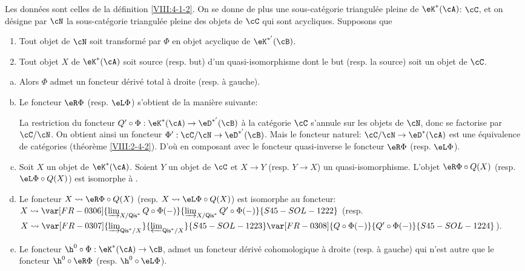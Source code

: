 \begin{theorem}\label{VIII:4-2-3} %
Les données sont celles de la définition \ref{VIII:4-1-2}. On se donne de 
plus une sous-catégorie triangulée pleine de $\eK^\ast(\cA)$: $\cC$, et on 
désigne par $\cN$ la sous-catégorie triangulée pleine des objets de $\cC$ 
qui sont acycliques. Supposons que 
\begin{enumerate}[(1)]
  \item Tout objet de $\cN$ soit transformé par $\Phi$ en objet acyclique 
    de $\eK^{\ast'}(\cB)$. 
  \item Tout objet $X$ de $\eK^\ast(\cA)$ soit source (resp. but) d'un 
    quasi-isomorphisme dont le but (resp. la source) soit un objet de $\cC$. 
\end{enumerate}
\begin{enumerate}[a)]
  \item Alors $\Phi$ admet un foncteur dérivé total à droite (resp. 
    à gauche). 
  \item {}Le foncteur $\eR \Phi$ (resp. $\eL \Phi$) s'obtient de la manière 
    suivante: 
    
    La restriction du foncteur 
    $Q'\circ \Phi:\eK^\ast(\cA) \to \eD^{\ast'}(\cB)$ à la catégorie $\cC$ 
    s'annule sur les objets de $\cN$, donc se factorise par $\cC/\cN$. On 
    obtient ainsi un foncteur $\Phi':\cC/\cN\to \eD^{\ast'}(\cB)$. Mais le 
    foncteur naturel: $\cC/\cN\to \eD^\ast(\cA)$ est une équivalence de 
    catégories (théorème \ref{VIII:2-4-2}). D'où en composant avec le 
    foncteur quasi-inverse le foncteur $\eR\Phi$ (resp. $\eL \Phi$). 
  \item Soit $X$ un objet de $\eK^\ast(\cA)$. Soient $Y$ un objet de $\cC$ et 
    $X\to Y$ (resp. $Y\to X$) un quasi-isomorphisme. L'objet 
    $\eR\Phi\circ Q(X)$ (resp. $\eL \Phi\circ Q(X)$) est isomorphe à 
    . 
  \item Le foncteur $X\leadsto \eR\Phi\circ Q(X)$ (resp. 
    $X\leadsto \eL \Phi\circ Q(X)$) est isomorphe au foncteur: 
    $X\leadsto \var[FR-0306]{\varinjlim_{X/\mathsf{Qis}^\ast} Q\circ\Phi(-)}{\varinjlim_{X/\mathsf{Qis}^\ast} Q'\circ\Phi(-)}{S45-SOL-1222}$ (resp. 
    $X\leadsto \var[FR-0307]{\varinjlim_{\mathsf{Qis}^\ast/X}}{\varprojlim_{\mathsf{Qis}^\ast/X}}{S45-SOL-1223} \var[FR-0308]{Q\circ \Phi(-)}{Q'\circ \Phi(-)}{S45-SOL-1224}$). 
  \item Le foncteur $\h^0{}\circ \Phi:\eK^\ast(\cA)\to \cB$, admet un 
    foncteur dérivé cohomologique à droite (resp. à gauche) qui n'est 
    autre que le foncteur $\h^0{}\circ\eR\Phi$ (resp. $\h^0{}\circ \eL\Phi$). 
\end{enumerate}
\end{theorem}





